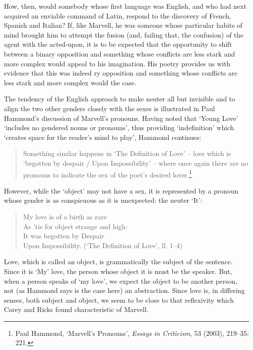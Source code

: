 ﻿\documentclass[12pt]{article}
\newcommand{\citedtitle}[1]{\textit{#1}}
\begin{document}
How,
then, would somebody whose first language was English, and who had next
acquired an enviable command of Latin, respond to the discovery of French,
Spanish and Italian? If, like Marvell, he was someone whose particular habits
of mind brought him to attempt the fusion (and, failing that, the confusion) of
the agent with the acted-upon, it is to be expected that the opportunity to
shift between a binary opposition and something whose conflicts are less stark and more complex would appeal to his imagination. His poetry provides us with
evidence that this was indeed ry opposition and something whose conflicts are
less stark and more complex would the case.

The
tendency of the English approach to make neuter all but invisible and to align
the two other genders closely with the sexes is illustrated in Paul Hammond’s
discussion of Marvell’s pronouns. Having noted that ‘Young Love’ ‘includes no
gendered nouns or pronouns’, thus providing ‘indefinition’ which ‘creates space
for the reader’s mind to play’, Hammond continues:

\begin{quote}
Something
similar happens in ‘The Definition of Love’ – love which is ‘begotten by
despair / Upon Impossibility’ – where once again there are no pronouns to
indicate the sex of the poet’s desired lover.\footnote{Paul Hammond,
‘Marvell’s Pronouns’, \citedtitle{Essays in Criticism}, 53 (2003), 219–35:
221.}
\end{quote}

However,
while the ‘object’ may not have a sex, it is represented by a pronoun whose
gender is as conspicuous as it is unexpected: the neuter ‘It’:

\begin{verse}My
love is of a birth as rare\\
As ’tis for object strange and high:\\
It was begotten by Despair\\
Upon Impossibility. (‘The Definition of Love’, ll. 1–4)
\end{verse}

Love,
which is called an object, is grammatically the subject of the sentence. Since
it is ‘My’ love, the person whose object it is must be the speaker. But, when a
person speaks of ‘my love’, we expect the object to be another person, not (as
Hammond says is the case here) an abstraction. Since love is, in differing
senses, both subject and object, we seem to be close to that reflexivity which
Carey and Ricks found characteristic of Marvell.
\end{document}

